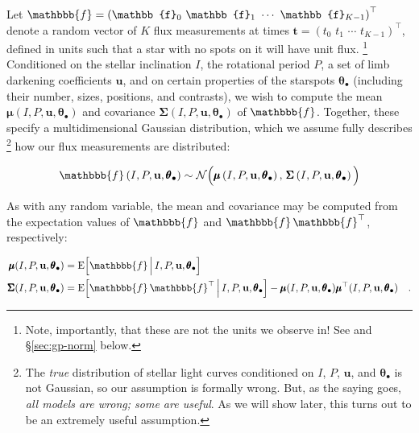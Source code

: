 \documentclass[modern,linenumbers]{aastex62}
\begin{document}
Let
$\mathbbb{f} = \left( \mathbb{f}_0 \,\, \mathbb{f}_1 \,\, \cdots \,\,  \mathbb{f}_{K-1} \right)^\top$
denote a random vector of $K$ flux measurements at times
$\mathbf{t} = \left( t_0 \,\,  t_1 \,\,  \cdots \,\, t_{K-1} \right)^\top$,
defined in units such that a star with no spots on it will have
unit flux.%
\footnote{
    Note, importantly, that these are not the units we observe in! See 
    and \S\ref{sec:gp-norm} below.
}
Conditioned on the stellar inclination $I$, the rotational period $P$,
a set of limb darkening coefficients $\mathbf{u}$, and
on certain properties of the starspots $\pmb{\theta}_\bullet$
(including their number, sizes, positions, and contrasts),
we wish to compute the mean $\pmb{\mu}(I, P, \mathbf{u}, \pmb{\theta}_\bullet)$ and
covariance $\pmb{\Sigma}(I, P, \mathbf{u}, \pmb{\theta}_\bullet)$
of $\mathbbb{f}$. Together, these specify a multidimensional Gaussian
distribution, which we assume fully describes%
\footnote{The \emph{true} distribution of stellar light curves conditioned
    on $I$, $P$, $\mathbf{u}$, and $\pmb{\theta}_\bullet$ is not Gaussian, so our
    assumption is formally wrong. But, as the saying goes, \emph{all models are
        wrong; some are useful}. As we will show later, this turns out to be
    an extremely useful assumption.}
how our flux measurements
are distributed:
%
\begin{linenomath}\begin{align}
        \mathbbb{f}\left(I, P, \mathbf{u}, \pmb{\theta}_\bullet\right) \sim
        \mathcal{N}\Big(
        \pmb{\mu}\left(I, P, \mathbf{u}, \pmb{\theta}_\bullet\right),
        \,
        \pmb{\Sigma}\left(I, P, \mathbf{u}, \pmb{\theta}_\bullet\right)
        \Big)
    \end{align}\end{linenomath}
%
As with any random variable, the mean and covariance may be computed from
the expectation values of $\mathbbb{f}$ and
$\mathbbb{f}\,\mathbbb{f}^\top$, respectively:
%
\begin{linenomath}\begin{align}
        \label{eq:mean}
        \pmb{\mu}(I, P, \mathbf{u}, \pmb{\theta}_\bullet)
         & = \mathrm{E} \Big[ \mathbbb{f} \, \Big| \, I, P, \mathbf{u}, \pmb{\theta}_\bullet \Big]
        \\
        \label{eq:cov}
        \pmb{\Sigma}(I, P, \mathbf{u}, \pmb{\theta}_\bullet)
         & = \mathrm{E} \Big[ \mathbbb{f} \, \mathbbb{f}^\top \, \Big| \, I, P, \mathbf{u}, \pmb{\theta}_\bullet \Big] - \pmb{\mu}(I, P, \mathbf{u}, \pmb{\theta}_\bullet) \pmb{\mu}^\top(I, P, \mathbf{u}, \pmb{\theta}_\bullet)
        \quad.
    \end{align}\end{linenomath}
\end{document}
